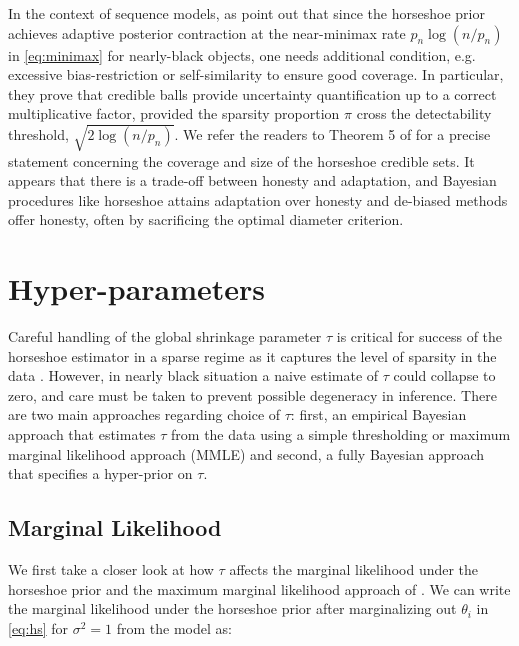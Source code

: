 \documentclass[sts,preprint]{imsart}
\begin{document}
In the context of sequence models, as \cite{van2017adaptive} point out that since the horseshoe prior achieves adaptive posterior contraction at the near-minimax rate $p_n \log(n/p_n)$ in \eqref{eq:minimax} for nearly-black objects, one needs additional condition, e.g. excessive bias-restriction \citep{belitser2015needles} or self-similarity to ensure good coverage. 
In particular, they prove that credible balls provide uncertainty quantification up to a correct multiplicative factor, provided the sparsity proportion $\pi$ cross the detectability threshold, $\sqrt{2 \log(n/p_n)}$. We refer the readers to Theorem 5 of \cite{van2017adaptive} for a precise statement concerning the coverage and size of the horseshoe credible sets. It appears that there is a trade-off between honesty and adaptation, and Bayesian procedures like horseshoe attains adaptation over honesty and de-biased methods offer honesty, often by sacrificing the optimal diameter criterion. 



\section{Hyper-parameters}\label{sec:5}
Careful handling of the global shrinkage parameter $\tau$ is critical for success of the horseshoe estimator in a sparse regime as it captures the level of sparsity in the data \citep{carvalho2010horseshoe, datta2013asymptotic, van2015conditions}. However, in nearly black situation a naive estimate of $\tau$ could collapse to zero, and care must be taken to prevent possible degeneracy in inference. There are two main approaches regarding choice of $\tau$: first, an empirical Bayesian approach that estimates $\tau$ from the data using a simple thresholding or maximum marginal likelihood approach (MMLE) and second, a fully Bayesian approach that specifies a hyper-prior on $\tau$.

\subsection{Marginal Likelihood} We first take a closer look at how $\tau$ affects the marginal likelihood under the horseshoe prior and the maximum marginal likelihood approach of \cite{van2017adaptive}. We can write the marginal likelihood under the horseshoe prior after marginalizing out $\theta_i$ in \eqref{eq:hs} for $\sigma^2 = 1$ from the model as:
\end{document}
